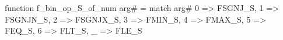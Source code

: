 function f_bin_op_S_of_num arg# = match arg# {
  0 => FSGNJ_S,
  1 => FSGNJN_S,
  2 => FSGNJX_S,
  3 => FMIN_S,
  4 => FMAX_S,
  5 => FEQ_S,
  6 => FLT_S,
  _ => FLE_S
}
